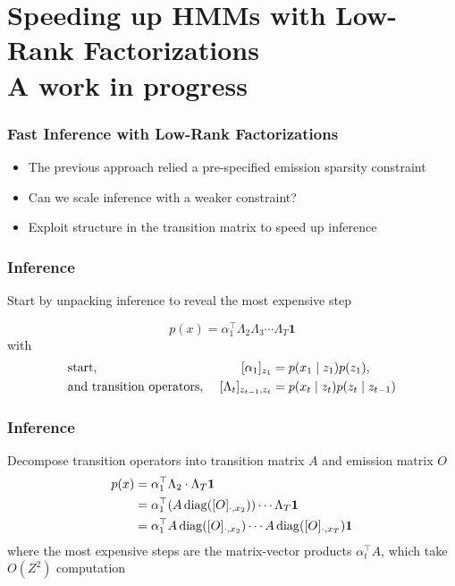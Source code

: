 \documentclass{beamer}
\begin{document}
\section{Speeding up HMMs with Low-Rank Factorizations\\{\normalsize A work in progress}}

\begin{frame}
\frametitle{Fast Inference with Low-Rank Factorizations}
\begin{itemize}
\item The previous approach relied a pre-specified emission sparsity constraint
\vspace{2em}
\item Can we scale inference with a weaker constraint?
\vspace{2em}
\item Exploit structure in the transition matrix to speed up inference
\end{itemize}
\end{frame}

\begin{frame}
\frametitle{Inference}
Start by unpacking inference to reveal the most expensive step

$$p(x) = \alpha_1^\top\Lambda_2\Lambda_3\cdots\Lambda_T\mathbf{1}$$
with
\begin{align*}
&\textnormal{start, } & [\alpha_1]_{z_1} &= p(x_1\mid z_1)p(z_1),\\
&\textnormal{and transition operators, }
    & [\Lambda_t]_{z_{t-1},z_t} &= p(x_t \mid z_t)p(z_t \mid z_{t-1})
\end{align*}
\end{frame}

\begin{frame}
\frametitle{Inference}
Decompose transition operators into transition matrix $A$ and emission matrix $O$
\begin{align*}
p(x) &= \alpha_1^\top\Lambda_2\cdot\Lambda_T\mathbf{1}\\
&= \alpha_1^\top (A \operatorname{diag}([O]_{\cdot,x_2}))  \cdots\Lambda_T\mathbf{1}\\
&= \alpha_1^\top A \operatorname{diag}([O]_{\cdot,x_2}) \cdots A \operatorname{diag}([O]_{\cdot,x_T}) \mathbf{1}
\end{align*}
where the most expensive steps are the matrix-vector products $\alpha_t^\top A$,
which take $O(Z^2)$ computation

\end{frame}
\end{document}

